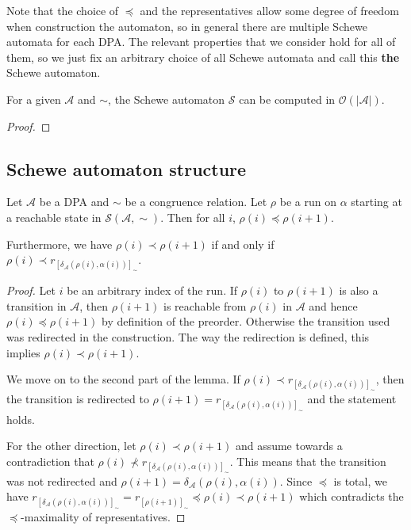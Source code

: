 Note that the choice of $\preceq$ and the representatives allow some degree of freedom when construction the automaton, so in general there are multiple Schewe automata for each DPA. The relevant properties that we consider hold for all of them, so we just fix an arbitrary choice of all Schewe automata and call this \textbf{the} Schewe automaton.

\begin{lem}
	For a given $\mathcal{A}$ and $\sim$, the Schewe automaton $\mathcal{S}$ can be computed in $\mathcal{O}(|\mathcal{A}|)$.
\end{lem}

\begin{proof}
\end{proof}





\newpage

\subsection{Schewe automaton structure}

\begin{lem}
\label{lem:schewe:run_growing}
	Let $\mathcal{A}$ be a DPA and $\sim$ be a congruence relation. Let $\rho$ be a run on $\alpha$ starting at a reachable state in $\mathcal{S}(\mathcal{A}, \sim)$. Then for all $i$, $\rho(i) \preceq \rho(i+1)$.
	
	Furthermore, we have $\rho(i) \prec \rho(i+1)$ if and only if $\rho(i) \prec r_{[\delta_\mathcal{A}(\rho(i), \alpha(i))]_\sim}$.
\end{lem}

\begin{proof}
	Let $i$ be an arbitrary index of the run. If $\rho(i)$ to $\rho(i+1)$ is also a transition in $\mathcal{A}$, then $\rho(i+1)$ is reachable from $\rho(i)$ in $\mathcal{A}$ and hence $\rho(i) \preceq \rho(i+1)$ by definition of the preorder. Otherwise the transition used was redirected in the construction. The way the redirection is defined, this implies $\rho(i) \prec \rho(i+1)$.
	
	We move on to the second part of the lemma. If $\rho(i) \prec r_{[\delta_\mathcal{A}(\rho(i), \alpha(i))]_\sim}$, then the transition is redirected to $\rho(i+1) = r_{[\delta_\mathcal{A}(\rho(i), \alpha(i))]_\sim}$ and the statement holds. 
	
	For the other direction, let $\rho(i) \prec \rho(i+1)$ and assume towards a contradiction that $\rho(i) \not\prec r_{[\delta_\mathcal{A}(\rho(i), \alpha(i))]_\sim}$. This means that the transition was not redirected and $\rho(i+1) = \delta_\mathcal{A}(\rho(i), \alpha(i))$. Since $\preceq$ is total, we have $r_{[\delta_\mathcal{A}(\rho(i), \alpha(i))]_\sim} = r_{[\rho(i+1)]_\sim} \preceq \rho(i) \prec \rho(i+1)$ which contradicts the $\preceq$-maximality of representatives.
\end{proof}

